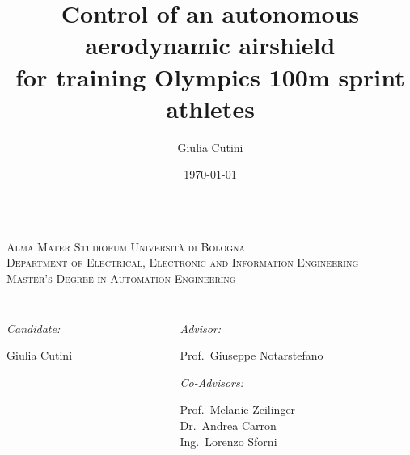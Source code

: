 \documentclass[10pt, aspectratio=169]{beamer}
\title[Control of an autonomous aerodynamic airshield]
  {\Large Control of an autonomous aerodynamic airshield \\
for training Olympics 100m sprint athletes}
\author[Giulia Cutini]{Giulia Cutini}
\institute[University of Bologna]{}
\date{\today}
\makeatletter
\newcommand{\myemph}[1]{\emph{\color{emph@Thesis}#1}}
\makeatother
\begin{document}
\footnotesize


\begin{frame}
\centering

\vspace{0.8cm}
\begin{columns}
\begin{column}{1.1\textwidth}
\centering \footnotesize
\textsc{Alma Mater Studiorum Universit\`{a} di Bologna}\\
\textsc{Department of Electrical, Electronic and Information Engineering}
\\
\vspace{0.2cm}
\textsc{Master's Degree in Automation Engineering}
\end{column}
\end{columns}

\vspace{0.5cm}

\textcolor{blue@Thesis}{\Large \bf \inserttitle}

\vspace{1cm}

\begin{columns}[t]
\begin{column}{0.5\textwidth}
	\myemph{Candidate:}
	
	\hspace{0.5cm} Giulia Cutini
\end{column}

\begin{column}{0.4\textwidth}
	\myemph{Advisor:}
	
		\hspace{0.5cm} Prof.~Giuseppe Notarstefano
		
		\vspace{.4cm}
		\myemph{Co-Advisors:}
	
		\hspace{0.5cm} Prof.~Melanie Zeilinger \\
		\hspace{0.5cm} Dr.~Andrea Carron \\
		\hspace{0.5cm} Ing.~Lorenzo Sforni
\end{column}
	
\end{columns}


\end{frame}
\end{document}
